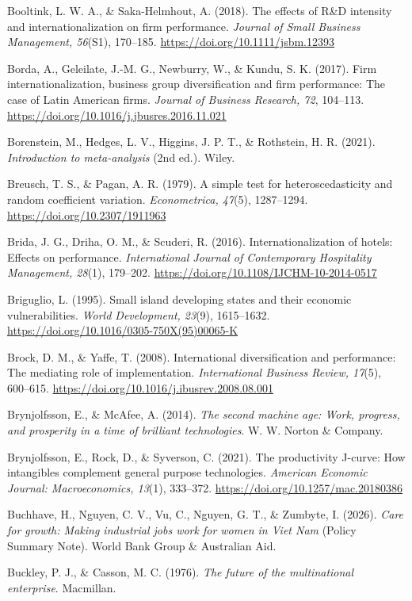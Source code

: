 \documentclass[
  a4paper,
  13pt]{extreport}
\begin{document}
Booltink, L. W. A., \& Saka-Helmhout, A. (2018). The effects of R\&D
intensity and internationalization on firm performance. \emph{Journal of
Small Business Management, 56}(S1), 170--185.
\url{https://doi.org/10.1111/jsbm.12393}

Borda, A., Geleilate, J.-M. G., Newburry, W., \& Kundu, S. K. (2017).
Firm internationalization, business group diversification and firm
performance: The case of Latin American firms. \emph{Journal of Business
Research, 72}, 104--113.
\url{https://doi.org/10.1016/j.jbusres.2016.11.021}

Borenstein, M., Hedges, L. V., Higgins, J. P. T., \& Rothstein, H. R.
(2021). \emph{Introduction to meta-analysis} (2nd ed.). Wiley.

Breusch, T. S., \& Pagan, A. R. (1979). A simple test for
heteroscedasticity and random coefficient variation. \emph{Econometrica,
47}(5), 1287--1294. \url{https://doi.org/10.2307/1911963}

Brida, J. G., Driha, O. M., \& Scuderi, R. (2016). Internationalization
of hotels: Effects on performance. \emph{International Journal of
Contemporary Hospitality Management, 28}(1), 179--202.
\url{https://doi.org/10.1108/IJCHM-10-2014-0517}

Briguglio, L. (1995). Small island developing states and their economic
vulnerabilities. \emph{World Development, 23}(9), 1615--1632.
\url{https://doi.org/10.1016/0305-750X(95)00065-K}

Brock, D. M., \& Yaffe, T. (2008). International diversification and
performance: The mediating role of implementation. \emph{International
Business Review, 17}(5), 600--615.
\url{https://doi.org/10.1016/j.ibusrev.2008.08.001}

Brynjolfsson, E., \& McAfee, A. (2014). \emph{The second machine age:
Work, progress, and prosperity in a time of brilliant technologies}. W.
W. Norton \& Company.

Brynjolfsson, E., Rock, D., \& Syverson, C. (2021). The productivity
J-curve: How intangibles complement general purpose technologies.
\emph{American Economic Journal: Macroeconomics, 13}(1), 333--372.
\url{https://doi.org/10.1257/mac.20180386}

Buchhave, H., Nguyen, C. V., Vu, C., Nguyen, G. T., \& Zumbyte, I.
(2026). \emph{Care for growth: Making industrial jobs work for women in
Viet Nam} (Policy Summary Note). World Bank Group \& Australian Aid.

Buckley, P. J., \& Casson, M. C. (1976). \emph{The future of the
multinational enterprise}. Macmillan.
\end{document}
